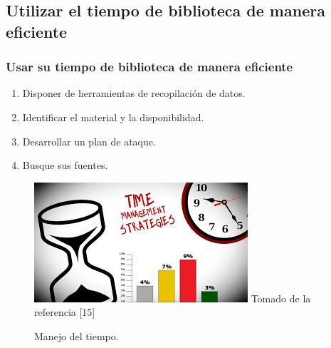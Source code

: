 \documentclass{beamer}
\newcounter{sauvegardeenumi}
\newcommand{\asuivre}{\setcounter{sauvegardeenumi}{\theenumi}}
\begin{document}
    \subsection{Utilizar el tiempo de biblioteca de manera eficiente}
        \begin{frame}\frametitle{Usar su tiempo de biblioteca de manera eficiente}
        \begin{multicols}{2}
            \begin{enumerate}
                \item Disponer de herramientas de recopilaci\'on de datos.
                \item Identificar el material y la disponibilidad.
                \item Desarrollar un plan de ataque. 
                \item Busque sus fuentes.            
                \asuivre
            \end{enumerate}
             \begin{figure}
                \includegraphics[scale=0.45]{figures/timeManagement}
                \newline
                {\tiny Tomado de la referencia [15] }
                \caption{Manejo del tiempo. }
            \end{figure}
        \end{multicols}
        \end{frame}
\end{document}
